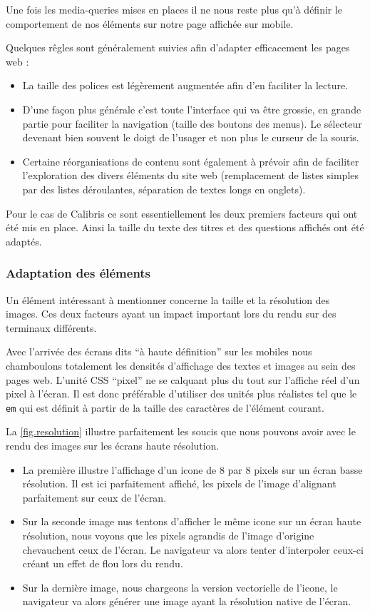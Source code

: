 \documentclass[12pt,a4paper]{book}
\begin{document}
Une fois les media-queries mises en places il ne nous reste plus qu'à définir le comportement de nos éléments sur notre page affichée sur mobile.

Quelques rêgles sont généralement suivies afin d'adapter efficacement les pages web :
\begin{itemize}
  \item La taille des polices est légèrement augmentée afin d'en faciliter la lecture.
  \item D'une façon plus générale c'est toute l'interface qui va être grossie, en grande partie pour faciliter la navigation (taille des boutons des menus). Le sélecteur devenant bien souvent le doigt de l'usager et non plus le curseur de la souris.
  \item Certaine réorganisations de contenu sont également à prévoir afin de faciliter l'exploration des divers éléments du site web (remplacement de listes simples par des listes déroulantes, séparation de textes longs en onglets).
\end{itemize}

Pour le cas de Calibris ce sont essentiellement les deux premiers facteurs qui ont été mis en place. Ainsi la taille du texte des titres et des questions affichés ont été adaptés.

\subsubsection{Adaptation des éléments}

Un élément intéressant à mentionner concerne la taille et la résolution des images. Ces deux facteurs ayant un impact important lors du rendu sur des terminaux différents.

Avec l'arrivée des écrans dits ``à haute définition'' sur les mobiles nous chamboulons totalement les densités d'affichage des textes et images au sein des pages web. L'unité CSS ``pixel'' ne se calquant plus du tout sur l'affiche réel d'un pixel à l'écran. Il est donc préférable d'utiliser des unités plus réalistes tel que le \texttt{em} qui est définit à partir de la taille des caractères de l'élément courant.

La \cref{fig.resolution} illustre parfaitement les soucis que nous pouvons avoir avec le rendu des images sur les écrans haute résolution. 

\begin{itemize}
  \item La première illustre l'affichage d'un icone de 8 par 8 pixels sur un écran basse résolution. Il est ici parfaitement affiché, les pixels de l'image d'alignant parfaitement sur ceux de l'écran.
  \item Sur la seconde image nus tentons d'afficher le même icone sur un écran haute résolution, nous voyons que les pixels agrandis de l'image d'origine chevauchent ceux de l'écran. Le navigateur va alors tenter d'interpoler ceux-ci créant un effet de flou lors du rendu.
  \item Sur la dernière image, nous chargeons la version vectorielle de l'icone, le navigateur va alors générer une image ayant la résolution native de l'écran.
\end{itemize}
\end{document}
